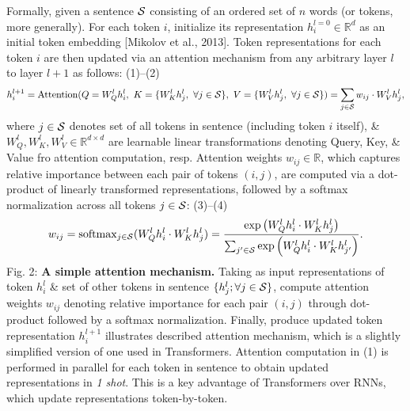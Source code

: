 \documentclass{article}
\begin{document}
\begin{itemize}
\begin{itemize}
        Formally, given a sentence ${\cal S}$ consisting of an ordered set of $n$ words (or tokens, more generally). For each token $i$, initialize its representation $h_i^{l=0}\in\mathbb{R}^d$ as an initial token embedding [Mikolov et al., 2013]. Token representations for each token $i$ are then updated via an attention mechanism from any arbitrary layer $l$ to layer $l + 1$ as follows: (1)--(2)
        \begin{equation*}
            h_i^{l + 1} = {\rm Attention}(Q = W_Q^lh_i^l,\ K = \{W_K^lh_j^l,\ \forall j\in{\cal S}\},\ V = \{W_V^lh_j^l,\ \forall j\in{\cal S}\}) = \sum_{j\in{\cal S}} w_{ij}\cdot W_V^lh_j^l,
        \end{equation*}
        where $j\in{\cal S}$ denotes set of all tokens in sentence (including token $i$ itself), \& $W_Q^l,W_K^l,W_V^l\in\mathbb{R}^{d\times d}$ are learnable linear transformations denoting Query, Key, \& Value fro attention computation, resp. Attention weights $w_{ij}\in\mathbb{R}$, which captures relative importance between each pair of tokens $(i,j)$, are computed via a dot-product of linearly transformed representations, followed by a softmax normalization across all tokens $j\in{\cal S}$: (3)--(4)
        \begin{equation*}
            w_{ij} = {\rm softmax}_{j\in{\cal S}} (W_Q^lh_i^l\cdot W_K^lh_j^l) = \frac{\exp\left(W_Q^lh_i^l\cdot W_K^lh_j^l\right)}{\sum_{j'\in{\cal S}} \exp\left(W_Q^lh_i^l\cdot W_K^lh_{j'}^l\right)}.
        \end{equation*}
        {\sf Fig. 2: {\bf A simple attention mechanism.} Taking as input representations of token $h_i^l$ \& set of other tokens in sentence $\{h_j^l;\forall j\in{\cal S}\}$, compute attention weights $w_{ij}$ denoting relative importance for each pair $(i,j)$ through dot-product followed by a softmax normalization. Finally, produce updated token representation $h_i^{l+1}$  } illustrates described attention mechanism, which is a slightly simplified version of one used in Transformers. Attention computation in (1) is performed in parallel for each token in sentence to obtain updated representations in {\it1 shot}. This is a key advantage of Transformers over RNNs, which update representations token-by-token.


\end{itemize}
\end{itemize}
\end{document}
